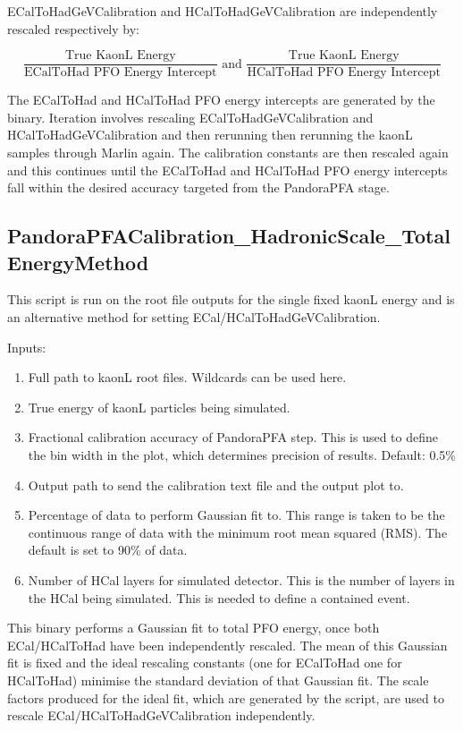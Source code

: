 \documentclass[11pt, oneside]{article}   	%
\begin{document}
ECalToHadGeVCalibration and HCalToHadGeVCalibration are independently rescaled respectively by:

\begin{equation}
\frac{\text{True KaonL Energy}}{\text{ECalToHad PFO Energy Intercept}} \text{ and } \frac{\text{True KaonL Energy}}{\text{HCalToHad PFO Energy Intercept}}
\end{equation}

The ECalToHad and HCalToHad PFO energy intercepts are generated by the binary.  Iteration involves rescaling ECalToHadGeVCalibration and HCalToHadGeVCalibration and then rerunning then rerunning the kaonL samples through Marlin again.  The calibration constants are then rescaled again and this continues until the ECalToHad and HCalToHad PFO energy intercepts fall within the desired accuracy targeted from the PandoraPFA stage.

\subsection{PandoraPFACalibration\_HadronicScale\_TotalEnergyMethod}

This script is run on the root file outputs for the single fixed kaonL energy and is an alternative method for setting ECal/HCalToHadGeVCalibration.

Inputs:
\begin{enumerate}
\item Full path to kaonL root files.  Wildcards can be used here.
\item True energy of kaonL particles being simulated.
\item Fractional calibration accuracy of PandoraPFA step.  This is used to define the bin width in the plot, which determines precision of results.  Default: 0.5\%
\item Output path to send the calibration text file and the output plot to.
\item Percentage of data to perform Gaussian fit to.  This range is taken to be the continuous range of data with the minimum root mean squared (RMS).  The default is set to 90\% of data.
\item Number of HCal layers for simulated detector.  This is the number of layers in the HCal being simulated.  This is needed to define a contained event.
\end{enumerate}

This binary performs a Gaussian fit to total PFO energy, once both ECal/HCalToHad have been independently rescaled.  The mean of this Gaussian fit is fixed and the ideal rescaling constants (one for ECalToHad one for HCalToHad) minimise the standard deviation of that Gaussian fit.  The scale factors produced for the ideal fit, which are generated by the script, are used to rescale ECal/HCalToHadGeVCalibration independently.
\end{document}
